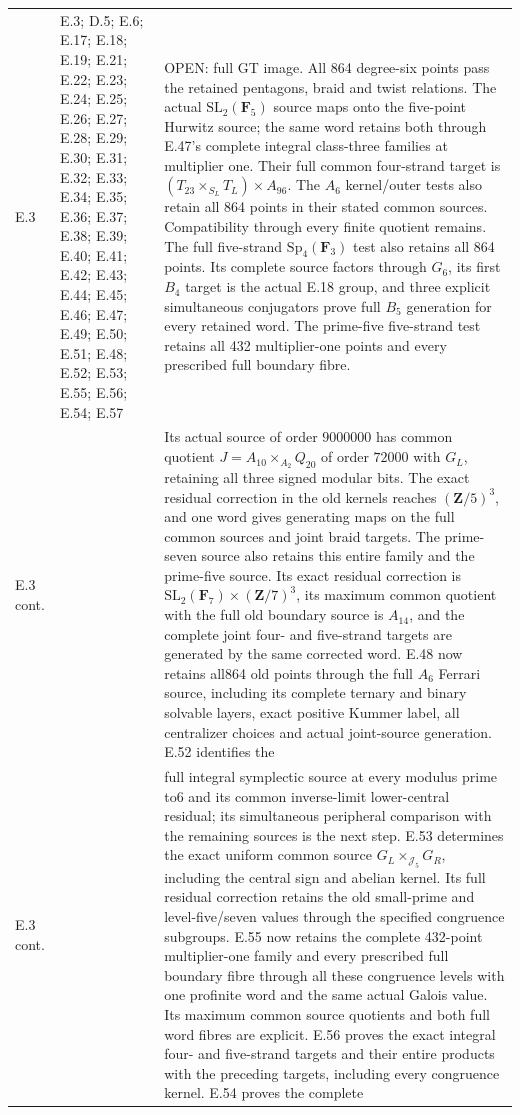 \begin{longtable}{@{}p{1.1cm}p{3.0cm}p{10.3cm}@{}}
E.3 & E.3; D.5; E.6; E.17; E.18; E.19; E.21; E.22; E.23; E.24; E.25; E.26; E.27; E.28; E.29; E.30; E.31; E.32; E.33; E.34; E.35; E.36; E.37; E.38; E.39; E.40; E.41; E.42; E.43; E.44; E.45; E.46; E.47; E.49; E.50; E.51; E.48; E.52; E.53; E.55; E.56; E.54; E.57 & OPEN: full GT image. All 864 degree-six points pass the retained pentagons, braid and twist relations. The actual $\mathrm{SL}_2(\mathbf F_5)$ source maps onto the five-point Hurwitz source; the same word retains both through E.47's complete integral class-three families at multiplier one. Their full common four-strand target is $(T_{23}\times_{S_L}T_L)\times A_{96}$. The $A_6$ kernel/outer tests also retain all 864 points in their stated common sources. Compatibility through every finite quotient remains. The full five-strand $\mathrm{Sp}_4(\mathbf F_3)$ test also retains all 864 points. Its complete source factors through $G_6$, its first $B_4$ target is the actual E.18 group, and three explicit simultaneous conjugators prove full $B_5$ generation for every retained word. The prime-five five-strand test retains all 432 multiplier-one points and every prescribed full boundary fibre.  \\
E.3 cont. &  & Its actual source of order $9000000$ has common quotient $J=A_{10}\times_{A_2}Q_{20}$ of order $72000$ with $G_L$, retaining all three signed modular bits. The exact residual correction in the old kernels reaches $(\mathbf Z/5)^3$, and one word gives generating maps on the full common sources and joint braid targets. The prime-seven source also retains this entire family and the prime-five source. Its exact residual correction is $\mathrm{SL}_2(\mathbf F_7)\times(\mathbf Z/7)^3$, its maximum common quotient with the full old boundary source is $A_{14}$, and the complete joint four- and five-strand targets are generated by the same corrected word. E.48 now retains all864 old points through the full $A_6$ Ferrari source, including its complete ternary and binary solvable layers, exact positive Kummer label, all centralizer choices and actual joint-source generation. E.52 identifies the  \\
E.3 cont. &  & full integral symplectic source at every modulus prime to6 and its common inverse-limit lower-central residual; its simultaneous peripheral comparison with the remaining sources is the next step. E.53 determines the exact uniform common source $G_L\times_{\mathcal J_5}G_R$, including the central sign and abelian kernel. Its full residual correction retains the old small-prime and level-five/seven values through the specified congruence subgroups. E.55 now retains the complete 432-point multiplier-one family and every prescribed full boundary fibre through all these congruence levels with one profinite word and the same actual Galois value. Its maximum common source quotients and both full word fibres are explicit. E.56 proves the exact integral four- and five-strand targets and their entire products with the preceding targets, including every congruence kernel. E.54 proves the complete  \\

\end{longtable}

